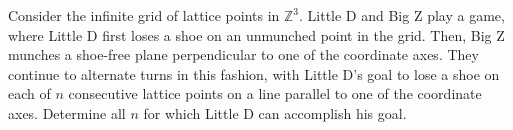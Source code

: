 Consider the infinite grid of lattice points in $\mathbb{Z}^3$. Little D and Big Z play a game, where Little D first loses a shoe on an unmunched point in the grid. Then, Big Z munches a shoe-free plane perpendicular to one of the coordinate axes. They continue to alternate turns in this fashion, with Little D's goal to lose a shoe on each of $n$ consecutive lattice points on a line parallel to one of the coordinate axes. Determine all $n$ for which Little D can accomplish his goal.